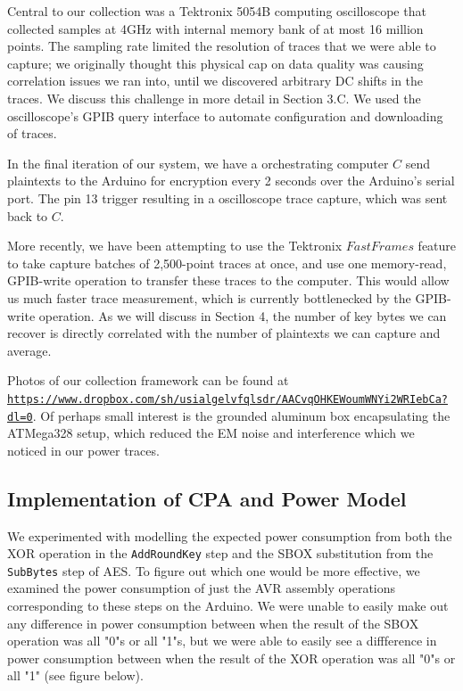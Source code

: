 \documentclass[journal]{ieee_style}
\begin{document}
Central to our collection was a Tektronix 5054B computing oscilloscope that collected samples at 4GHz with internal memory bank of at most 16 million points. The sampling rate limited the resolution of traces that we were able to capture; we originally thought this physical cap on data quality was causing correlation issues we ran into, until we discovered arbitrary DC shifts in the traces. We discuss this challenge in more detail in Section 3.C. We used the oscilloscope's GPIB query interface to automate configuration and downloading of traces.

In the final iteration of our system, we have a orchestrating computer $C$ send plaintexts to the Arduino for encryption every 2 seconds over the Arduino's serial port. The pin 13 trigger resulting in a oscilloscope trace capture, which was sent back to $C$. 

More recently, we have been attempting to use the Tektronix $Fast Frames$ feature to take capture batches of 2,500-point traces at once, and use one memory-read, GPIB-write operation to transfer these traces to the computer. This would allow us much faster trace measurement, which is currently bottlenecked by the GPIB-write operation. As we will discuss in Section 4, the number of key bytes we can recover is directly correlated with the number of plaintexts we can capture and average.

Photos of our collection framework can be found at \texttt{\url{https://www.dropbox.com/sh/usialgelvfqlsdr/AACvqOHKEWoumWNYi2WRIebCa?dl=0}}. Of perhaps small interest is the grounded aluminum box encapsulating the ATMega328 setup, which reduced the EM noise and interference which we noticed in our power traces.

\subsection{Implementation of CPA and Power Model}

We experimented with modelling the expected power consumption from both the XOR operation in the \texttt{AddRoundKey} step and the SBOX substitution from the \texttt{SubBytes} step of AES. To figure out which one would be more effective, we examined the power consumption of just the AVR assembly operations corresponding to these steps on the Arduino. We were unable to easily make out any difference in power consumption between when the result of the SBOX operation was all "0"s or all "1"s, but we were able to easily see a diffference in power consumption between when the result of the XOR operation was all "0"s or all "1" (see figure below).
\end{document}
